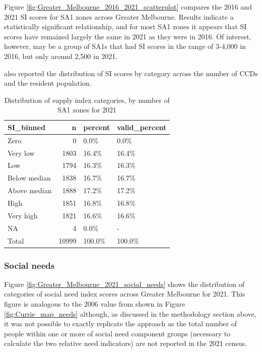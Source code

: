 \documentclass[preprint, 3p,
authoryear]{elsarticle} %
\begin{document}
Figure \ref{fig:Greater_Melbourne_2016_2021_scatterplot} compares the
2016 and 2021 SI scores for SA1 zones across Greater Melbourne. Results
indicate a statistically significant relationship, and for most SA1
zones it appears that SI scores have remained largely the same in 2021
as they were in 2016. Of interest, however, may be a group of SA1s that
had SI scores in the range of 3-4,000 in 2016, but only around 2,500 in
2021.

\citet{currie2010identifying} also reported the distribution of SI
scores by category across the number of CCDs and the resident
population.

\begin{table}

\caption{\label{tab:Greater_Melbourne_2016_2021_sa1_population}Distribution of supply index categories, by number of SA1 zones for 2021}
\centering
\begin{tabular}[t]{l|r|l|l}
\hline
SI\_binned & n & percent & valid\_percent\\
\hline
Zero & 0 & 0.0\% & 0.0\%\\
\hline
Very low & 1803 & 16.4\% & 16.4\%\\
\hline
Low & 1794 & 16.3\% & 16.3\%\\
\hline
Below median & 1838 & 16.7\% & 16.7\%\\
\hline
Above median & 1888 & 17.2\% & 17.2\%\\
\hline
High & 1851 & 16.8\% & 16.8\%\\
\hline
Very high & 1821 & 16.6\% & 16.6\%\\
\hline
NA & 4 & 0.0\% & -\\
\hline
Total & 10999 & 100.0\% & 100.0\%\\
\hline
\end{tabular}
\end{table}

\subsubsection{Social needs}\label{social-needs}

Figure \ref{fig:Greater_Melbourne_2021_social_needs} shows the
distribution of categories of social need index scores across Greater
Melbourne for 2021. This figure is analogous to the 2006 value from
\citet{currie2010identifying} shown in Figure \ref{fig:Currie_map_needs}
although, as discussed in the methodology section above, it was not
possible to exactly replicate the \citet{currie2010identifying} approach
as the total number of people within one or more of social need
component groups (necessary to calculate the two relative need
indicators) are not reported in the 2021 census.
\end{document}
